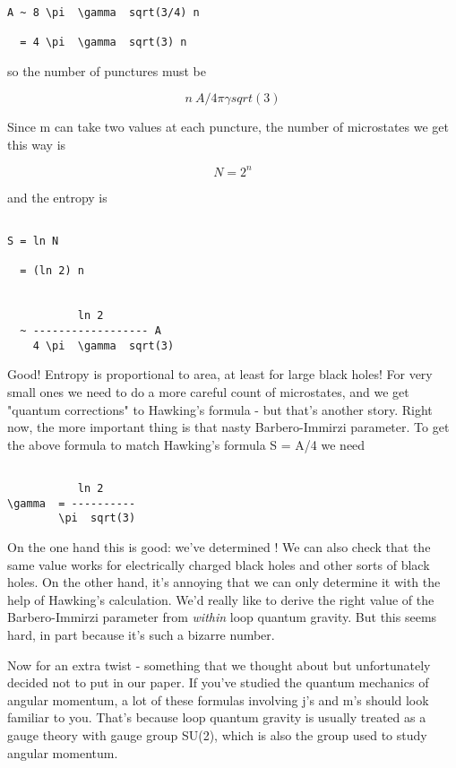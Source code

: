 \begin{verbatim}

A ~ 8 \pi  \gamma  sqrt(3/4) n 

  = 4 \pi  \gamma  sqrt(3) n
\end{verbatim}
    
so the number of punctures must be


$$

n ~ A / 4 \pi  \gamma  sqrt(3)
$$
    
Since m can take two values at each puncture, the number of microstates
we get this way is


$$

N = 2^{n}
$$
    
and the entropy is


\begin{verbatim}

S = ln N

  = (ln 2) n


           ln 2 
  ~ ------------------ A
    4 \pi  \gamma  sqrt(3)  
\end{verbatim}
    
Good!  Entropy is proportional to area, at least for large black holes!
For very small ones we need to do a more careful count of microstates,
and we get "quantum corrections" to Hawking's formula - but that's
another story.  Right now, the more important thing is that nasty
Barbero-Immirzi parameter.  To get the above formula to match Hawking's
formula S = A/4 we need


\begin{verbatim}

           ln 2
\gamma  = ----------
        \pi  sqrt(3)

\end{verbatim}
    
On the one hand this is good: we've determined \gamma !  We can also check
that the same value works for electrically charged black holes and
other sorts of black holes.  On the other hand, it's annoying that we
can only determine it with the help of Hawking's calculation.  We'd
really like to derive the right value of the Barbero-Immirzi parameter
from \emph{within} loop quantum gravity.  But this seems hard, in part
because it's such a bizarre number.

Now for an extra twist - something that we thought about but
unfortunately decided not to put in our paper.  If you've studied the
quantum mechanics of angular momentum, a lot of these formulas involving
j's and m's should look familiar to you.  That's because loop quantum
gravity is usually treated as a gauge theory with gauge group SU(2),
which is also the group used to study angular momentum.

